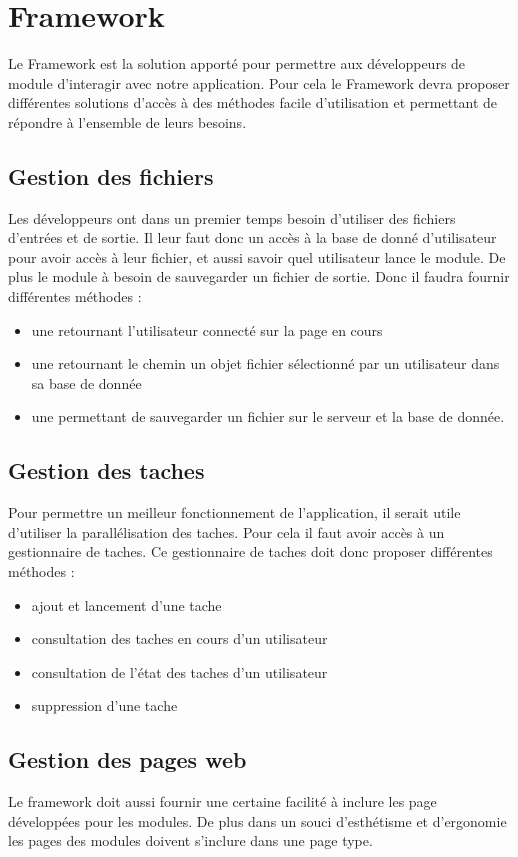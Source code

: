 \section{Framework}

Le Framework est la solution apporté pour permettre aux développeurs de module d'interagir avec notre application. Pour cela le Framework devra proposer différentes solutions d'accès à des méthodes facile d'utilisation et permettant de répondre à l'ensemble de leurs besoins. \\


\subsection{Gestion des fichiers}

Les développeurs ont dans un premier temps besoin d'utiliser des fichiers d'entrées et de sortie. Il leur faut donc un accès à la base de donné d'utilisateur pour avoir accès à leur fichier, et aussi savoir quel utilisateur lance le module. De plus le module à besoin de sauvegarder un fichier de sortie. Donc il faudra fournir différentes méthodes :\\
\begin{itemize}
\item une retournant l'utilisateur connecté sur la page en cours
\item une retournant le chemin un objet fichier sélectionné par un utilisateur dans sa base de donnée
\item une permettant de sauvegarder un fichier sur le serveur et la base de donnée.
\end{itemize}

\subsection{Gestion des taches}

Pour permettre un meilleur fonctionnement de l'application, il serait utile d'utiliser la parallélisation des taches. Pour cela il faut avoir accès à un gestionnaire de taches. Ce gestionnaire de taches doit donc proposer différentes méthodes : \\
\begin{itemize}
\item ajout et lancement d'une tache
\item consultation des taches en cours d'un utilisateur
\item consultation de l'état des taches d'un utilisateur
\item suppression d'une tache
\end{itemize}


\subsection{Gestion des pages web}

Le framework doit aussi fournir une certaine facilité à inclure les page développées pour les modules. De plus dans un souci d'esthétisme et d'ergonomie les pages des modules doivent s'inclure dans une page type.